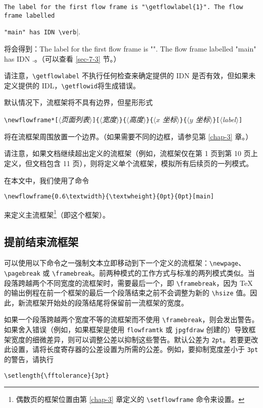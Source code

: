 \documentclass[a4paper]{book}%
\newcommand{\filename}[1]{\texttt{#1}}
\newcommand{\meta}[1]{\textnormal{\ensuremath{\langle}\makebox[0pt][l]{}\emph{#1}\makebox[0pt][l]{}\ensuremath{\rangle}}}
\newcommand{\cmd}[1]{\texttt{#1}}
\begin{document}
{\noindent\verb|The label for the first flow frame is "\getflowlabel{1}". The flow frame labelled|}\framebreak

{\noindent\verb|"main" has IDN \verb|\myid|.}\vspace*{7pt}

\noindent 将会得到：The label for the first flow frame is "". The flow frame labelled "main" has IDN \myid.。（可以查看 \ref{sec-7-3} 节。）

请注意，\verb|\getflowlabel| 不执行任何检查来确定提供的 IDN 是否有效，但如果未定义提供的 IDL，\verb|\getflowid|将生成错误。

默认情况下，流框架将不具有边界，但星形形式
\begin{mdframed}
\verb|\newflowframe*[|\meta{页面列表}\verb|]{|\meta{宽度}\verb|}{|\meta{高度}\verb|}{|\meta{$x$ 坐标}\verb|}{|\meta{$y$ 坐标}\verb|}[|\meta{label}\verb|]|
\end{mdframed}
将在流框架周围放置一个边界。（如果需要不同的边框，请参见第 \ref{chap-3} 章。）

请注意，如果文档继续超出定义的流框架（例如，流框架仅在第 1 页到第 10 页上定义，但文档包含 11 页），则将定义单个流框架，模拟所有后续页的一列模式。

在本文中，我们使用了命令
\begin{mdframed}[backgroundcolor=white]
\verb|\newflowframe{0.6\textwidth}{\textwheight}{0pt}{0pt}[main]|
\end{mdframed}
来定义主流框架\footnote{偶数页的框架位置由第 \ref{chap-3} 章定义的 \cmd{\textbackslash{setflowframe}} 命令来设置。}（即这个框架）。
\subsection{提前结束流框架}\label{sec-2-1-1}%
可以使用以下命令之一强制文本立即移动到下一个定义的流框架：\verb|\newpage|、\verb|\pagebreak| 或 \verb|\framebreak|。前两种模式的工作方式与标准的两列模式类似。当段落跨越两个不同宽度的流框架时，需要最后一个，即 \verb|\framebreak|，因为 \TeX 的输出例程在前一个框架的最后一个段落结束之前不会调整为新的 \verb|\hsize| 值。因此，新流框架开始处的段落结尾将保留前一流框架的宽度。

如果一个段落跨越两个宽度不等的流框架而不使用 \verb|\framebreak|，则会发出警告。如果舍入错误（例如，如果框架是使用 \filename{flowframtk} 或 \filename{jpgfdraw} 创建的）导致框架宽度的细微差异，则可以调整公差以抑制这些警告。默认公差为 \cmd{2pt}。若要更改此设置，请将长度寄存器的公差设置为所需的公差。例如，要抑制宽度差小于 \cmd{3pt} 的警告，请执行
\begin{mdframed}[backgroundcolor=white]
\verb|\setlength{\fftolerance}{3pt}|
\end{mdframed}
\end{document}
